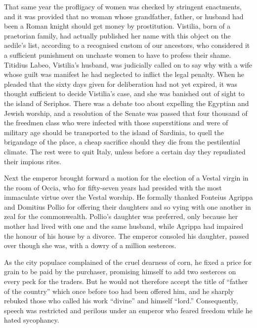 That same year the profligacy of women was checked by stringent enactments, and it was provided that no woman whose grandfather, father, or husband had been a Roman knight should get money by prostitution. Vistilia, born of a praetorian family, had actually published her name with this object on the aedile's list, according to a recognised custom of our ancestors, who considered it a sufficient punishment on unchaste women to have to profess their shame. Titidius Labeo, Vistilia's husband, was judicially called on to say why with a wife whose guilt was manifest he had neglected to inflict the legal penalty. When he pleaded that the sixty days given for deliberation had not yet expired, it was thought sufficient to decide Vistilia's case, and she was banished out of sight to the island of Seriphos. There was a debate too about expelling the Egyptian and Jewish worship, and a resolution of the Senate was passed that four thousand of the freedmen class who were infected with those superstitions and were of military age should be transported to the island of Sardinia, to quell the brigandage of the place, a cheap sacrifice should they die from the pestilential climate. The rest were to quit Italy, unless before a certain day they repudiated their impious rites.


Next the emperor brought forward a motion for the election of a Vestal virgin in the room of Occia, who for fifty-seven years had presided with the most immaculate virtue over the Vestal worship. He formally thanked Fonteius Agrippa and Domitius Pollio for offering their daughters and so vying with one another in zeal for the commonwealth. Pollio's daughter was preferred, only because her mother had lived with one and the same husband, while Agrippa had impaired the honour of his house by a divorce. The emperor consoled his daughter, passed over though she was, with a dowry of a million sesterces.


As the city populace complained of the cruel dearness of corn, he fixed a price for grain to be paid by the purchaser, promising himself to add two sesterces on every peck for the traders. But he would not therefore accept the title of ``father of the country'' which once before too had been offered him, and he sharply rebuked those who called his work ``divine'' and himself ``lord.'' Consequently, speech was restricted and perilous under an emperor who feared freedom while he hated sycophancy.

